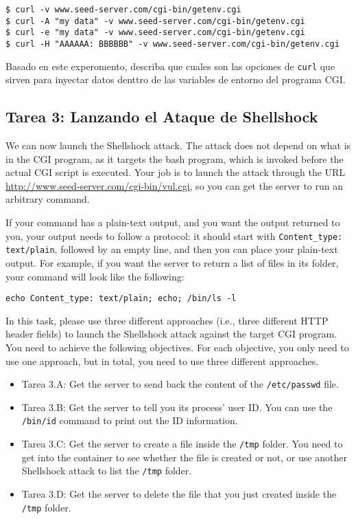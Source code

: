 \begin{lstlisting}
$ curl -v www.seed-server.com/cgi-bin/getenv.cgi
$ curl -A "my data" -v www.seed-server.com/cgi-bin/getenv.cgi
$ curl -e "my data" -v www.seed-server.com/cgi-bin/getenv.cgi
$ curl -H "AAAAAA: BBBBBB" -v www.seed-server.com/cgi-bin/getenv.cgi
\end{lstlisting}
 
Basado en este experomento, describa que cuales son las opciones de \texttt{curl} que sirven para inyectar datos denttro de las variables de entorno del programa CGI.


\subsection{Tarea 3: Lanzando el Ataque de Shellshock}

We can now launch the Shellshock attack. 
The attack does not depend on what is in the CGI program, as it targets
the bash program, which is invoked before the actual CGI script is
executed. Your job is to launch the attack through the URL
\url{http://www.seed-server.com/cgi-bin/vul.cgi}, so you can
get the server to run an arbitrary command. 


If your command has a plain-text output, and you want the output returned to you,
your output needs to follow a protocol: it should start with 
\texttt{Content\_type: text/plain}, followed by an empty line, and then
you can place your plain-text output. For example, if you want the
server to return a list of files in its folder, your command  
will look like the following: 

\begin{lstlisting}
echo Content_type: text/plain; echo; /bin/ls -l
\end{lstlisting}
 

In this task, please use three different approaches (i.e., three different HTTP header fields)
to launch the Shellshock attack against the target CGI program. You need to achieve 
the following objectives. For each objective, you only need to use one approach,
but in total, you need to use three different approaches. 

\begin{itemize}
\item Tarea 3.A: Get the server to send back the content of the \texttt{/etc/passwd} file. 

\item Tarea 3.B: Get the server to tell you its process' user ID. You can use 
the \texttt{/bin/id} command to print out the ID information. 

\item Tarea 3.C: Get the server to create a file inside the \texttt{/tmp} folder. You need to 
get into the container to see whether the file is created or not, or use 
another Shellshock attack to list the \texttt{/tmp} folder.

\item Tarea 3.D: Get the server to delete the file that you just created 
inside the \texttt{/tmp} folder. 
\end{itemize} 


